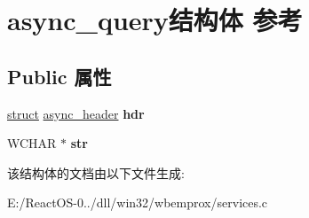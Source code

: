 \hypertarget{structasync__query}{}\section{async\+\_\+query结构体 参考}
\label{structasync__query}
\subsection*{Public 属性}
\begin{DoxyCompactItemize}
\item 
\mbox{\label{structasync__query_a4b57fe804c0a7b6fc777dbae3d3b96d1}} 
\hyperlink{interfacestruct}{struct} \hyperlink{structasync__header}{async\+\_\+header} {\bfseries hdr}
\item 
\mbox{\label{structasync__query_acf60fab3e07e611b1beba2f6c82166e2}} 
W\+C\+H\+AR $\ast$ {\bfseries str}
\end{DoxyCompactItemize}


该结构体的文档由以下文件生成\+:\begin{DoxyCompactItemize}
\item 
E\+:/\+React\+O\+S-\/0../dll/win32/wbemprox/services.\+c\end{DoxyCompactItemize}

